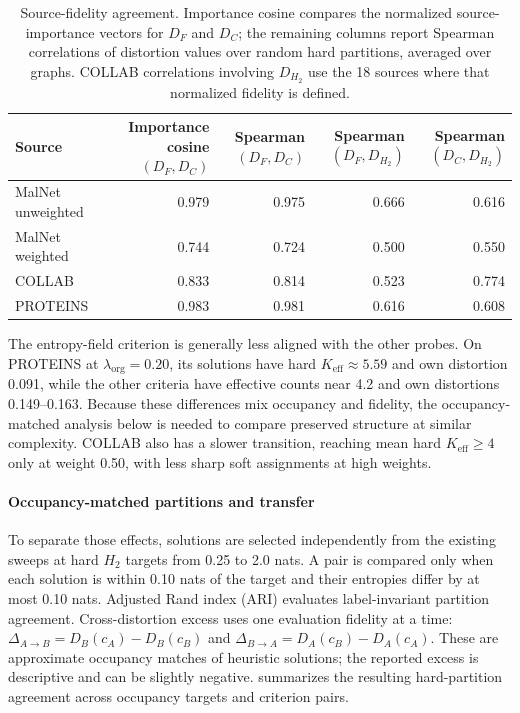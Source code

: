 \begin{table}[t]
\centering\small
\begin{tabular}{lrrrr}
\toprule
Source & \shortstack{Importance cosine\\$(D_F,D_C)$} & \shortstack{Spearman\\$(D_F,D_C)$} & \shortstack{Spearman\\$(D_F,D_{H_2})$} & \shortstack{Spearman\\$(D_C,D_{H_2})$} \\
\midrule
MalNet unweighted & 0.979 & 0.975 & 0.666 & 0.616 \\
MalNet weighted & 0.744 & 0.724 & 0.500 & 0.550 \\
COLLAB & 0.833 & 0.814 & 0.523 & 0.774 \\
PROTEINS & 0.983 & 0.981 & 0.616 & 0.608 \\
\bottomrule
\end{tabular}
\caption{Source-fidelity agreement. Importance cosine compares the normalized source-importance vectors for $D_F$ and $D_C$; the remaining columns report Spearman correlations of distortion values over random hard partitions, averaged over graphs. COLLAB correlations involving $D_{H_2}$ use the 18 sources where that normalized fidelity is defined.}
\label{tab:transductive-distortion-correlations}
\end{table}

The entropy-field criterion is generally less aligned with the other probes.
On PROTEINS at $\lambda_{\mathrm{org}}=0.20$, its solutions have hard $K_{\mathrm{eff}}\approx5.59$ and own distortion 0.091, while the other criteria have effective counts near 4.2 and own distortions 0.149--0.163.
Because these differences mix occupancy and fidelity, the occupancy-matched analysis below is needed to compare preserved structure at similar complexity.
COLLAB also has a slower transition, reaching mean hard $K_{\mathrm{eff}}\ge4$ only at weight 0.50, with less sharp soft assignments at high weights.

\paragraph{Occupancy-matched partitions and transfer}
To separate those effects, solutions are selected independently from the existing sweeps at hard $H_2$ targets from 0.25 to 2.0 nats.
A pair is compared only when each solution is within 0.10 nats of the target and their entropies differ by at most 0.10 nats.
Adjusted Rand index (ARI) evaluates label-invariant partition agreement.
Cross-distortion excess uses one evaluation fidelity at a time: $\Delta_{A\to B}=D_B(c_A)-D_B(c_B)$ and $\Delta_{B\to A}=D_A(c_B)-D_A(c_A)$.
These are approximate occupancy matches of heuristic solutions; the reported excess is descriptive and can be slightly negative.
 summarizes the resulting hard-partition agreement across occupancy targets and criterion pairs.

